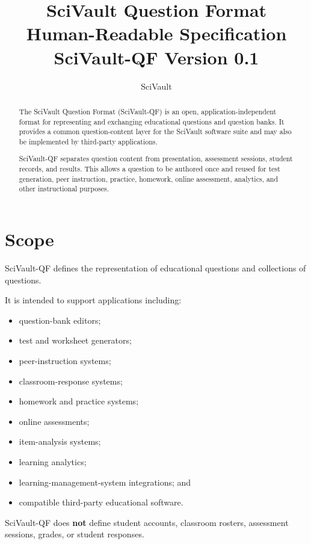 \documentclass[11pt]{article}
\title{
	\textbf{SciVault Question Format}\\
	Human-Readable Specification\\
	\large SciVault-QF Version 0.1
}
\author{SciVault}
\date{}
\begin{document}
	
	\maketitle
	
	\begin{abstract}
		The SciVault Question Format (SciVault-QF) is an open,
		application-independent format for representing and exchanging educational
		questions and question banks. It provides a common question-content layer for
		the SciVault software suite and may also be implemented by third-party
		applications.
		
		SciVault-QF separates question content from presentation, assessment
		sessions, student records, and results. This allows a question to be
		authored once and reused for test generation, peer instruction, practice,
		homework, online assessment, analytics, and other instructional purposes.
	\end{abstract}
	
	\tableofcontents
	\newpage
	
	\section{Scope}
	
	SciVault-QF defines the representation of educational questions and
	collections of questions.
	
	It is intended to support applications including:
	
	\begin{itemize}
		\item question-bank editors;
		\item test and worksheet generators;
		\item peer-instruction systems;
		\item classroom-response systems;
		\item homework and practice systems;
		\item online assessments;
		\item item-analysis systems;
		\item learning analytics;
		\item learning-management-system integrations; and
		\item compatible third-party educational software.
	\end{itemize}
	
	SciVault-QF does \textbf{not} define student accounts, classroom rosters,
	assessment sessions, grades, or student responses.
	
\end{document}
